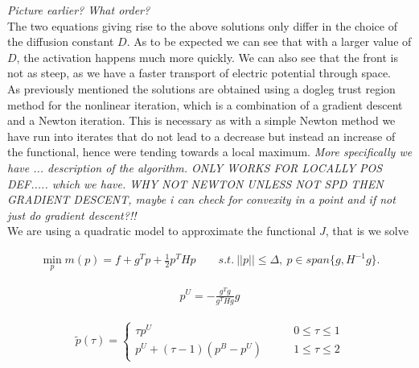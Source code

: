 \documentclass[../draft_1.tex]{subfiles}
\begin{document}
\textit{Picture earlier? What order?} 
\smallskip
\\
The two equations giving rise to the above solutions only differ in the choice of the diffusion constant $D$. As to be expected we can see that with a larger value of $D$, the activation happens much more quickly. We can also see that the front is not as steep, as we have a faster transport of electric potential through space. 
\smallskip
\\
As previously mentioned the solutions are obtained using a dogleg trust region method for the nonlinear iteration, which is a combination of a gradient descent and a Newton iteration. This is necessary as with a simple Newton method we have run into iterates that do not lead to a decrease but instead an increase of the functional, hence were tending towards a local maximum.  \textit{More specifically we have ... description of the algorithm. ONLY WORKS FOR LOCALLY POS DEF.....	which we have. WHY NOT NEWTON UNLESS NOT SPD THEN GRADIENT DESCENT, maybe i can check for convexity in a point and if not just do gradient descent?!!} 	
\smallskip
\\
We are using a quadratic model to approximate the functional $J$, that is we solve

\begin{ceqn}
	\begin{equation}
	\begin{aligned}
	\min_p m(p) = f + g^T p + \frac{1}{2} p^T H p \qquad s.t. \ ||p|| \leq \Delta, \ p \in span\{g, H^{-1}g\}. 
	\end{aligned}
	\end{equation}
\end{ceqn}

\begin{ceqn}
	\begin{equation}
	\begin{aligned}
	p^U = - \frac{g^Tg}{g^T H g} g
	\end{aligned}
	\end{equation}
\end{ceqn}

\begin{ceqn}
	\begin{equation}
	\begin{aligned}
	\tilde{p}(\tau) = \begin{cases}
	\tau p^U \qquad &0 \leq \tau \leq 1 \\
	p^U + (\tau - 1)(p^B - p^U) \qquad &1 \leq \tau \leq 2
	\end{cases}
	\end{aligned}
	\end{equation}
\end{ceqn}
\end{document}

